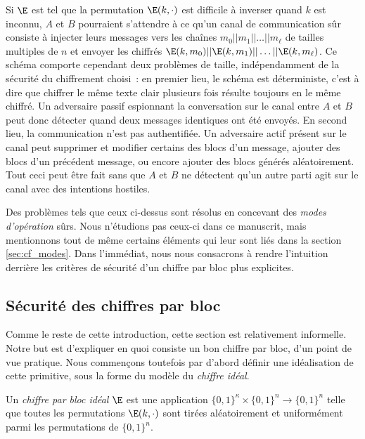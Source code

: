 Si $\E$ est tel que la permutation $\E(k,\cdot)$ est difficile à inverser quand $k$ est inconnu, $A$ et $B$
pourraient s'attendre à ce qu'un canal de communication sûr consiste à injecter leurs messages
vers les chaînes
$m_0||m_1||\ldots||m_\ell$ de tailles multiples de $n$ et envoyer les chiffrés
$\E(k,m_0)||\E(k,m_1)||\ldots||\E(k,m_\ell)$.
Ce schéma comporte cependant deux problèmes de taille, indépendamment de la sécurité du chiffrement choisi~:
en premier lieu, le schéma est déterministe, c'est à dire que chiffrer le même texte clair plusieurs fois résulte toujours en le
même chiffré. Un adversaire passif espionnant la conversation sur le canal entre $A$ et $B$ peut donc
détecter quand deux messages identiques ont été envoyés. En second lieu, la communication n'est pas authentifiée. Un
adversaire actif présent sur le canal peut supprimer et modifier certains des blocs d'un message,
ajouter des blocs d'un précédent message, ou encore ajouter des blocs générés aléatoirement. Tout ceci peut
être fait sans que $A$ et $B$ ne détectent qu'un autre parti agit sur le canal avec des intentions hostiles. 

Des problèmes tels que ceux ci-dessus sont résolus en concevant des \emph{modes d'opération} sûrs. Nous n'étudions
pas ceux-ci dans ce manuscrit, mais mentionnons tout de même certains éléments qui leur sont liés dans
la section \ref{sec:cf_modes}. Dans l'immédiat, nous nous consacrons à rendre l'intuition derrière les critères de sécurité
d'un chiffre par bloc plus explicites. 

\subsection{Sécurité des chiffres par bloc}

Comme le reste de cette introduction, cette section est relativement informelle. Notre but est d'expliquer en
quoi consiste un bon chiffre par bloc, d'un point de vue pratique. Nous commençons toutefois par d'abord
définir une idéalisation de cette primitive, sous la forme du modèle du \emph{chiffre idéal}.

\begin{fdefi}
Un \emph{chiffre par bloc idéal} $\E$ est une application
$\{0,1\}^\kappa \times \{0,1\}^n \rightarrow \{0,1\}^n$ telle que toutes les permutations
$\E(k,\cdot)$ sont tirées aléatoirement et uniformément parmi les permutations de $\{0,1\}^n$.
\end{fdefi}

